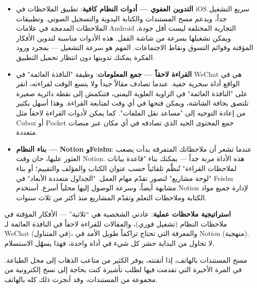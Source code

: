 \begin{itemize}
  \item \textbf{التدوين العفوي — أدوات النظام كافية}: تطبيق الملاحظات في iOS سريع التشغيل جداً، ويدعم مسح المستندات والكتابة اليدوية والتسجيل الصوتي. وتطبيقات الملاحظات المدمجة في علامات Android التجارية المختلفة ليست أقل جودة، ويمكن تشغيلها بسرعة من شاشة القفل. هذه الأدوات مناسبة لتدوين الأفكار المؤقتة وقوائم التسوق ونقاط الاجتماعات. المهم هو سرعة التشغيل — بمجرد ورود الفكرة يمكنك تدوينها دون انتظار تحميل التطبيق.
  \item \textbf{القراءة لاحقاً — جمع المعلومات}: وظيفة "النافذة العائمة" في WeChat هي في الواقع أداة سحرية خفية. عندما تصادف مقالاً جيداً ولا يتسع الوقت لقراءته، انقر على "النافذة العائمة" في الزاوية العلوية اليمنى، فتنكمش إلى نقطة دائرية صغيرة تلتصق بحافة الشاشة، ويمكن فتحها في أي وقت لمتابعة القراءة. وهذا أسهل بكثير من إعادة التوجيه إلى "مساعد نقل الملفات". كما يمكن لأدوات القراءة لاحقاً مثل Cubox أو Pocket جمع المحتوى الجيد الذي تصادفه في أي مكان عبر منصات متعددة.
  \item \textbf{بناء النظام — Notion وFeishu}: عندما تشعر أن ملاحظاتك المتفرقة بدأت يصعب العثور عليها، حان وقت Notion. هذه الأداة مرنة جداً — يمكنك بناء "قاعدة بيانات لملاحظات القراءة" تُنظَّم تلقائياً حسب عنوان الكتاب والمؤلف والتقييم؛ أو بناء "لوحة مشاريع" لتصور تقدّم مهام العمل. "الجداول متعددة الأبعاد" في Feishu مشابهة أيضاً، وسرعة الوصول إليها محلياً أسرع. أستخدم Notion لإدارة جميع مواد الكتابة وملاحظات التعلم وتقدّم المشاريع منذ أكثر من ثلاث سنوات.
\end{itemize}

\textbf{استراتيجية ملاحظات عملية}: عادتي الشخصية هي “ثلاثية” — الأفكار المؤقتة في ملاحظات النظام (تشغيل فوري)، والمقالات للقراءة لاحقاً في النافذة العائمة لـ WeChat (في المتناول)، والمعرفة التي تحتاج تراكماً طويل الأمد في Notion (منهجية). لا تحاول من البداية حشر كل شيء في أداة واحدة، فهذا يسهّل الاستسلام.


مسح المستندات بالهاتف، إذا أتقنته، يوفر الكثير من متاعب الذهاب إلى محل الطباعة. في المرة الأخيرة التي تقدمت فيها لطلب تأشيرة كنت بحاجة إلى نسخ إلكترونية من مجموعة من المستندات، وقد أنجزت ذلك كله بالهاتف.

